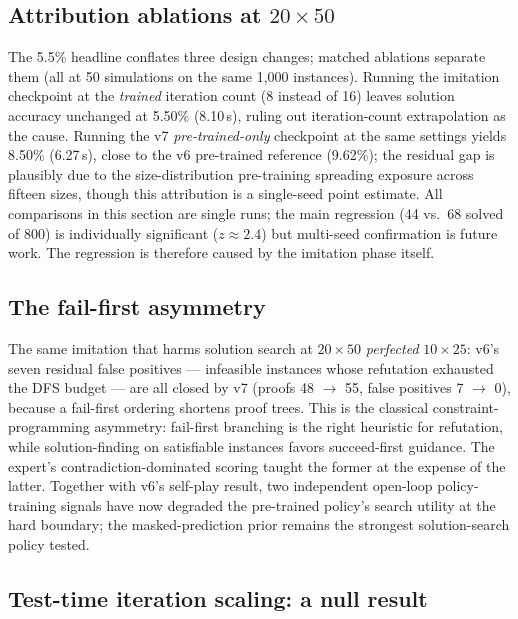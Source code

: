 \documentclass[12pt]{article}
\begin{document}
\subsection{Attribution ablations at $20 \times 50$}

The 5.5\% headline conflates three design changes; matched ablations separate them (all at 50 simulations on the same 1{,}000 instances). Running the imitation checkpoint at the \emph{trained} iteration count (8 instead of 16) leaves solution accuracy unchanged at 5.50\% (8.10\,s), ruling out iteration-count extrapolation as the cause. Running the v7 \emph{pre-trained-only} checkpoint at the same settings yields 8.50\% (6.27\,s), close to the v6 pre-trained reference (9.62\%); the residual gap is plausibly due to the size-distribution pre-training spreading exposure across fifteen sizes, though this attribution is a single-seed point estimate. All comparisons in this section are single runs; the main regression (44 vs.\ 68 solved of 800) is individually significant ($z \approx 2.4$) but multi-seed confirmation is future work. The regression is therefore caused by the imitation phase itself.

\subsection{The fail-first asymmetry}

The same imitation that harms solution search at $20 \times 50$ \emph{perfected} $10 \times 25$: v6's seven residual false positives --- infeasible instances whose refutation exhausted the DFS budget --- are all closed by v7 (proofs 48 $\rightarrow$ 55, false positives 7 $\rightarrow$ 0), because a fail-first ordering shortens proof trees. This is the classical constraint-programming asymmetry: fail-first branching is the right heuristic for refutation, while solution-finding on satisfiable instances favors succeed-first guidance. The expert's contradiction-dominated scoring taught the former at the expense of the latter. Together with v6's self-play result, two independent open-loop policy-training signals have now degraded the pre-trained policy's search utility at the hard boundary; the masked-prediction prior remains the strongest solution-search policy tested.

\subsection{Test-time iteration scaling: a null result}
\end{document}
